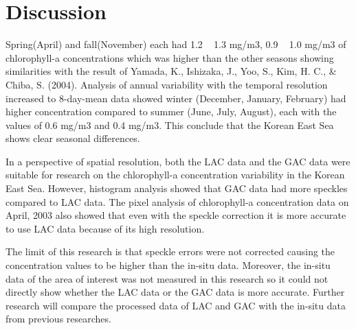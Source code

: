 \section{Discussion}
Spring(April) and fall(November) each had 1.2 ~ 1.3 mg/m3, 0.9 ~ 1.0 mg/m3 of chlorophyll-a concentrations which was higher than the other seasons showing similarities with the result of Yamada, K., Ishizaka, J., Yoo, S., Kim, H. C., & Chiba, S. (2004). Analysis of annual variability with the temporal resolution increased to 8-day-mean data showed winter (December, January, February) had higher concentration compared to summer (June, July, August), each with the values of 0.6 mg/m3 and 0.4 mg/m3. This conclude that the Korean East Sea shows clear seasonal differences.

In a perspective of spatial resolution, both the LAC data and the GAC data were suitable for research on the chlorophyll-a concentration variability in the Korean East Sea. However, histogram analysis showed that GAC data had more speckles compared to LAC data. The pixel analysis of chlorophyll-a concentration data on April, 2003 also showed that even with the speckle correction it is more accurate to use LAC data because of its high resolution.

The limit of this research is that speckle errors were not corrected causing the concentration values to be higher than the in-situ data. Moreover, the in-situ data of the area of interest was not measured in this research so it could not directly show whether the LAC data or the GAC data is more accurate. Further research will compare the processed data of LAC and GAC with the in-situ data from previous researches.
